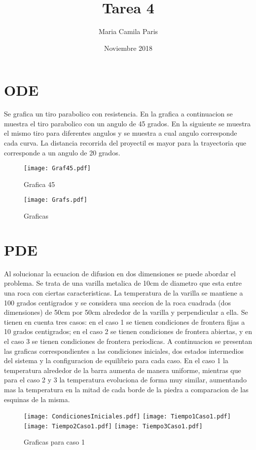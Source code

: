 \documentclass{article}
\title{Tarea 4}
\author{Maria Camila Paris}
\date{Noviembre 2018}
\begin{document}
\maketitle

\section{ODE}
Se grafica un tiro parabolico con resistencia. En la grafica a continuacion se muestra el tiro parabolico con un angulo de 45 grados. En la siguiente se muestra el mismo tiro para diferentes angulos y se muestra a cual angulo corresponde cada curva. La distancia recorrida del proyectil es mayor para la trayectoria que corresponde a un angulo de 20 grados. 
\begin{figure}[h!]
\centering
\texttt{[image: Graf45.pdf]}
\caption{Grafica 45}
\label{fig:Graf45}
\end{figure}
\begin{figure}[h!]
\centering
\texttt{[image: Grafs.pdf]}
\caption{Graficas}
\label{fig:Grafs}
\end{figure}

\section{PDE}
Al solucionar la ecuacion de difusion en dos dimensiones se puede abordar el problema. Se trata de una varilla metalica de 10cm de diametro que esta entre una roca con ciertas caracteristicas. La temperatura de la varilla se mantiene a 100 grados centigrados y se considera una seccion de la roca cuadrada (dos dimensiones) de 50cm por 50cm alrededor de la varilla y perpendicular a ella. Se tienen en cuenta tres casos: en el caso 1 se tienen condiciones de frontera fijas a 10 grados centigrados; en el caso 2 se tienen condiciones de frontera abiertas, y en el caso 3 se tienen condiciones de frontera periodicas.
A continuacion se presentan las graficas correspondientes a las condiciones iniciales, dos estados intermedios del sistema y la configuracion de equilibrio para cada caso. En el caso 1 la temperatura alrededor de la barra aumenta de manera uniforme, mientras que para el caso 2 y 3 la temperatura evoluciona de forma muy similar, aumentando mas la temperatura en la mitad de cada borde de la piedra a comparacion de las esquinas de la misma.

\begin{figure}[h!]
\centering
\texttt{[image: CondicionesIniciales.pdf]}
\texttt{[image: Tiempo1Caso1.pdf]}
\texttt{[image: Tiempo2Caso1.pdf]}
\texttt{[image: Tiempo3Caso1.pdf]}
\caption{Graficas para caso 1}
\label{fig:GrafPDE1}
\end{figure}
\end{document}
